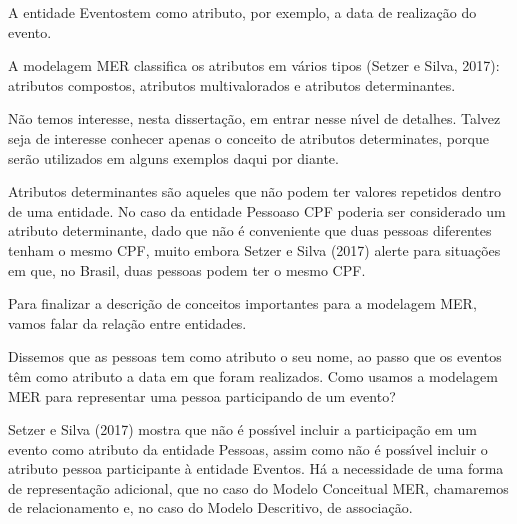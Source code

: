 \documentclass[
12pt,		%
openright,	%
twoside,  %
a4paper,			%
chapter=TITLE,		%
english,			%
french,				%
spanish,			%
brazil				%
]{USPSC-classe/USPSC_RedarTex}
\begin{document}
A entidade \textquotedbl Eventos\textquotedbl  tem como atributo, por exemplo, a data de realiza\c{c}\~ao do evento.








A modelagem MER classifica os atributos em v\'arios tipos (Setzer e Silva, 2017): atributos compostos, atributos multivalorados e atributos determinantes.








N\~ao temos interesse, nesta disserta\c{c}\~ao, em entrar nesse n\'{\i}vel de detalhes. Talvez seja de interesse conhecer apenas o conceito de \textquotedbl atributos determinates\textquotedbl , porque ser\~ao utilizados em alguns exemplos daqui por diante.








Atributos determinantes s\~ao aqueles que n\~ao podem ter valores repetidos dentro de uma entidade. No caso da entidade \textquotedbl Pessoas\textquotedbl  o CPF poderia ser considerado um atributo determinante, dado que n\~ao \'e conveniente que duas pessoas diferentes tenham o mesmo CPF, muito embora  Setzer e Silva (2017) alerte para situa\c{c}\~oes em que, no Brasil, duas pessoas podem ter o mesmo CPF.








Para finalizar a descri\c{c}\~ao de conceitos importantes para a modelagem MER, vamos falar da rela\c{c}\~ao entre entidades.








Dissemos que as pessoas tem como atributo o seu nome, ao passo que os eventos t\^em como atributo a data em que foram realizados. Como usamos a modelagem MER para representar uma pessoa participando de um evento?








Setzer e Silva (2017) mostra que n\~ao \'e poss\'{\i}vel incluir a participa\c{c}\~ao em um evento como atributo da entidade \textquotedbl Pessoas\textquotedbl , assim como n\~ao \'e poss\'{\i}vel incluir o atributo pessoa participante \`a entidade \textquotedbl Eventos\textquotedbl . H\'a a necessidade de uma forma de representa\c{c}\~ao adicional, que no caso do Modelo Conceitual MER, chamaremos de relacionamento e, no caso do Modelo Descritivo, de associa\c{c}\~ao.
\end{document}
